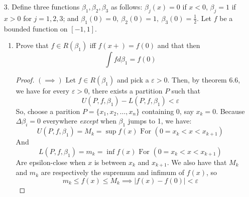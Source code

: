 \documentclass[hidelinks,12pt]{article}
\renewcommand{\leq}{\leqslant}
\begin{document}
\begin{enumerate}
    \item[3.] Define three functions \(\beta_{1},\beta_{2},\beta_{3}\) as follows: \(\beta_{j}(x)=0\) if \(x<0\), \(\beta_{j}=1\) if \(x>0\) for \(j=1,2,3\); and \(\beta_{1}(0)=0,\ \beta_{2}(0)=1,\ \beta_{3}(0)=\frac{1}{2}\). Let \(f\) be a bounded function on \([-1,1]\).
        \begin{enumerate}[label=(\alph*).]
            \item Prove that \(f\in R(\beta_{1})\) iff \(f(x+)=f(0)\) and that then \[
            \int f d \beta_{1}=f(0)
            \]
            \begin{proof}
            \((\implies)\) Let \(f\in R(\beta_{1})\) and pick a \(\varepsilon>0\). Then, by theorem 6.6, we have for every \(\varepsilon>0\), there exists a partition \(P\) such that \[
           U(P,f,\beta_{1})-L(P,f,\beta_{1})<\varepsilon
            \]
            So, choose a parition \(P=\{x_{1},x_{2},\dots,x_{n}\}\) containing 0, say \(x_{k}=0\). Because \(\Delta \beta_{i}=0\) everywhere \emph{except} when \(\beta_{1}\) jumps to 1, we have:
            \[
                U(P,f,\beta_{1})=M_{k}=\sup f(x)\text{  For }(0=x_{k}<x<x_{k+1})
        \]
            And\[
                L(P,f,\beta_{1})=m_{k}=\inf f(x)\text{  For }(0=x_{k}<x<x_{k+1})
            \]
           Are epsilon-close when \(x\) is between \(x_{k}\) and \(x_{k+1}\). We also have that \(M_{k}\) and \(m_{k}\) are respectively the supremum and infimum of \(f(x)\), so
\[
m_{k}\leq f(x)\leq M_{k}\implies |f(x)-f(0)|<\varepsilon
\]


\end{proof}
\end{enumerate}
\end{enumerate}
\end{document}
